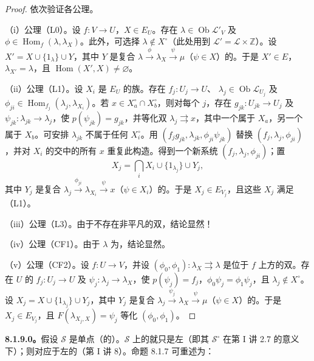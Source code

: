 \begin{proof}依次验证各公理。

（i）公理（L0）。设 $f:V\to U$，$X\in E_U$。存在 $\lambda\in\operatorname{Ob}\mathscr L'_V$ 及 $\phi\in\operatorname{Hom}_f(\lambda,\lambda_X)$。此外，可选择 $\lambda\notin X^\circ$（此处用到 $\mathscr L'=\mathscr L\times\mathbb Z$）。设 $X'=X\cup\{1_\lambda\}\cup Y$，其中 $Y$ 是复合 $\lambda\xrightarrow{\phi}\lambda_X\xrightarrow{\psi}\mu$（$\psi\in X$）的。于是 $X'\in E$，$\lambda_{X'}=\lambda$，且 $\operatorname{Hom}(X',X)\ne\varnothing$。

（ii）公理（L1）。设 $X_i$ 是 $E_U$ 的族。存在 $f_j:U_j\to U$、 $\lambda_j\in\operatorname{Ob}\mathscr L_{U_j}$ 及 $\phi_{ji}\in\operatorname{Hom}_{f_j}(\lambda_j,\lambda_{X_i})$。若 $x\in X_a^\circ\cap X_b^\circ$，则对每个 $j$，存在 $g_{jk}:U_{jk}\to U_j$ 及 $\psi_{jk}:\lambda_{jk}\to\lambda_j$，使 $p(\psi_{jk})=g_{jk}$，并等化双 $\lambda_j\rightrightarrows x$，其中一个属于 $X_a$，另一个属于 $X_b$。可安排 $\lambda_{jk}$ 不属于任何 $X_i^\circ$。用 $(f_jg_{jk},\lambda_{jk},\phi_{ji}\psi_{jk})$ 替换 $(f_j,\lambda_j,\phi_{ji})$，并对 $X_i$ 的交中的所有 $x$ 重复此构造。得到一个新系统 $(f_j,\lambda_j,\phi_{ji})$；置
\[X_j=\bigcap_iX_i\cup\{1_{\lambda_j}\}\cup Y_j,\]
其中 $Y_j$ 是复合 $\lambda_j\xrightarrow{\phi_{ji}}\lambda_{X_i}\xrightarrow{\psi}x$（$\psi\in X_i$）的。于是 $X_j\in E_{V_j}$，且这些 $X_j$ 满足（L1）。

（iii）公理（L3）。由于不存在非平凡的双，结论显然！

（iv）公理（CF1）。由于 $\lambda$ 为，结论显然。

（v）公理（CF2）。设 $f:U\to V$，并设 $(\phi_0,\phi_1):\lambda_X\rightrightarrows\lambda$ 是位于 $f$ 上方的双。存在 $U$ 的 $f_j:U_j\to U$ 及 $\psi_j:\lambda_j\to\lambda_X$，使 $p(\psi_j)=f_j$，$\phi_0\psi_j=\phi_1\psi_j$，且 $\lambda_j\notin X^\circ$。设 $X_j=X\cup\{1_{\lambda_j}\}\cup Y_j$，其中 $Y_j$ 是复合 $\lambda_j\xrightarrow{\psi_j}\lambda_X\xrightarrow{\psi}\mu$（$\psi\in X$）的。于是 $X_j\in E_{V_j}$，且 $F(\lambda_{X_j,X})=\psi_j$ 等化 $(\phi_0,\phi_1)$。
\end{proof}
\textbf{8.1.9.0。}假设 $\mathscr S$ 是单点（的）。$\mathscr S$ 上的就只是左（即其 $\mathscr S^\circ$ 在第 I 讲 2.7 的意义下）；则对应于左的（第 I 讲 8）。命题 8.1.7 可重述为：
